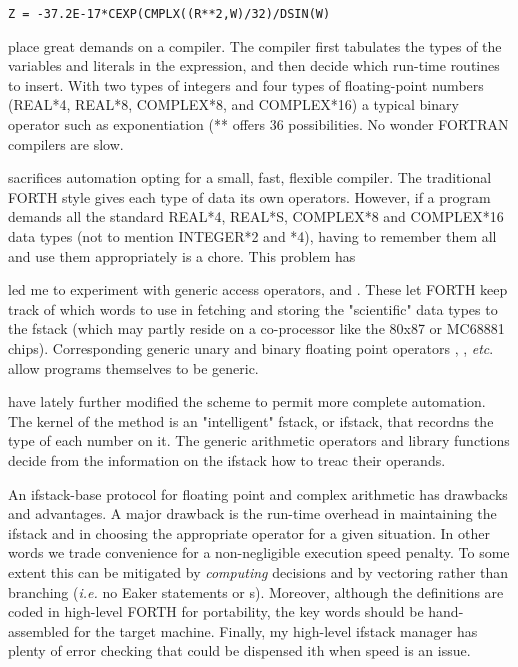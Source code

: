 \begin{lstlisting}
Z = -37.2E-17*CEXP(CMPLX((R**2,W)/32)/DSIN(W)
\end{lstlisting}

place great demands on a compiler. The compiler first tabulates the types of the variables and literals in the expression, and then decide which run-time routines to insert. With two types of integers and four types of floating-point numbers (REAL*4, REAL*8, COMPLEX*8, and COMPLEX*16) a typical binary operator such as exponentiation (** offers 36 possibilities. No wonder FORTRAN compilers are slow. 

 sacrifices automation opting for a small, fast, flexible compiler. The traditional FORTH style gives each type of data its own operators. However, if a program demands all the standard REAL*4, REAL*S, COMPLEX*8 and COMPLEX*16 data types (not to mention INTEGER*2 and *4), having to remember them all and use them appropriately is a chore. This problem has

led me to experiment with generic access operators,  and . These let FORTH keep track of which words to use in fetching and storing the "scientific" data types to the fstack (which may partly reside on a co-processor like the 80x87 or MC68881 chips). Corresponding generic unary and binary floating point operators , , \textit{etc}. allow programs themselves to be generic.

 have lately further modified the scheme to permit more complete automation. The kernel of the method is an "intelligent" fstack, or ifstack, that recordns the type of each number on it. The generic arithmetic operators and library functions decide from the information on the ifstack how to treac their operands.

An ifstack-base protocol for floating point and complex arithmetic has drawbacks and advantages. A major drawback is the run-time overhead in maintaining the ifstack and in choosing the appropriate operator for a given situation. In other words we trade convenience for a non-negligible execution speed penalty. To some extent this can be mitigated by \textit{computing} decisions and by vectoring rather than branching (\textit{i.e.} no Eaker  statements or s). Moreover, although the definitions are coded in high-level FORTH for portability, the key words should be hand-assembled for the target machine. Finally, my high-level ifstack manager has plenty of error checking that could be dispensed ith when speed is an issue.

